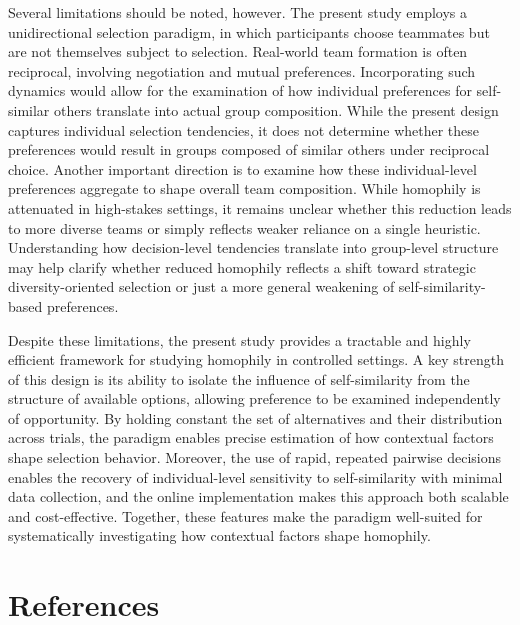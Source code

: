 \documentclass[
  man,
  floatsintext,
  longtable,
  nolmodern,
  notxfonts,
  notimes,
  draftfirst,
  colorlinks=true,linkcolor=blue,citecolor=blue,urlcolor=blue]{apa7}
\begin{document}
Several limitations should be noted, however. The present study employs
a unidirectional selection paradigm, in which participants choose
teammates but are not themselves subject to selection. Real-world team
formation is often reciprocal, involving negotiation and mutual
preferences. Incorporating such dynamics would allow for the examination
of how individual preferences for self-similar others translate into
actual group composition. While the present design captures individual
selection tendencies, it does not determine whether these preferences
would result in groups composed of similar others under reciprocal
choice. Another important direction is to examine how these
individual-level preferences aggregate to shape overall team
composition. While homophily is attenuated in high-stakes settings, it
remains unclear whether this reduction leads to more diverse teams or
simply reflects weaker reliance on a single heuristic. Understanding how
decision-level tendencies translate into group-level structure may help
clarify whether reduced homophily reflects a shift toward strategic
diversity-oriented selection or just a more general weakening of
self-similarity-based preferences.

Despite these limitations, the present study provides a tractable and
highly efficient framework for studying homophily in controlled
settings. A key strength of this design is its ability to isolate the
influence of self-similarity from the structure of available options,
allowing preference to be examined independently of opportunity. By
holding constant the set of alternatives and their distribution across
trials, the paradigm enables precise estimation of how contextual
factors shape selection behavior. Moreover, the use of rapid, repeated
pairwise decisions enables the recovery of individual-level sensitivity
to self-similarity with minimal data collection, and the online
implementation makes this approach both scalable and cost-effective.
Together, these features make the paradigm well-suited for
systematically investigating how contextual factors shape homophily.

\section{References}\label{references}
\end{document}
